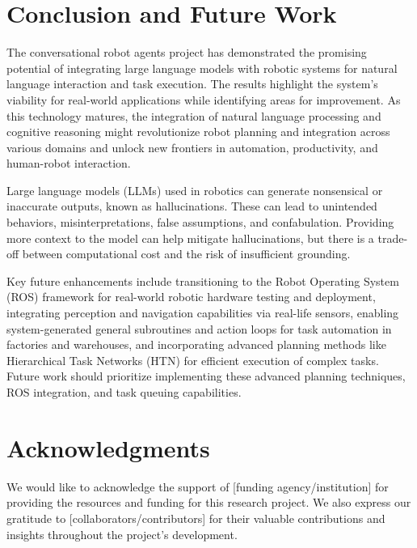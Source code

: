 \documentclass[pdflatex,sn-mathphys-num]{sn-jnl}%
\theoremstyle{thmstyleone}%
\theoremstyle{thmstyletwo}%
\theoremstyle{thmstylethree}%
\begin{document}
\section{Conclusion and Future Work}
The conversational robot agents project has demonstrated the promising potential of integrating large language models with robotic systems for natural language interaction and task execution. The results highlight the system's viability for real-world applications while identifying areas for improvement. As this technology matures, the integration of natural language processing and cognitive reasoning might revolutionize robot planning and integration across various domains and unlock new frontiers in automation, productivity, and human-robot interaction.

Large language models (LLMs) used in robotics can generate nonsensical or inaccurate outputs, known as hallucinations. These can lead to unintended behaviors, misinterpretations, false assumptions, and confabulation. Providing more context to the model can help mitigate hallucinations, but there is a trade-off between computational cost and the risk of insufficient grounding.

Key future enhancements include transitioning to the Robot Operating System (ROS) framework for real-world robotic hardware testing and deployment, integrating perception and navigation capabilities via real-life sensors, enabling system-generated general subroutines and action loops for task automation in factories and warehouses, and incorporating advanced planning methods like Hierarchical Task Networks (HTN) for efficient execution of complex tasks. Future work should prioritize implementing these advanced planning techniques, ROS integration, and task queuing capabilities.
 
\section*{Acknowledgments}
We would like to acknowledge the support of [funding agency/institution] for providing the resources and funding for this research project. We also express our gratitude to [collaborators/contributors] for their valuable contributions and insights throughout the project's development.
\end{document}
